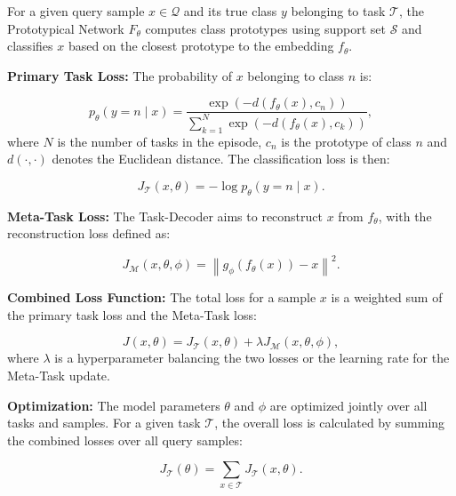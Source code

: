For a given query sample \( x\in\mathcal{Q} \) and its true class \( y \) belonging to task $\mathcal{T}$, the Prototypical Network $F_{\theta}$ computes class prototypes using support set $\mathcal{S}$ and classifies $x$ based on the closest prototype to the embedding $f_{\theta}$.

\noindent
\textbf{Primary Task Loss:} The probability of \( x \) belonging to class \( n \) is:

\begin{equation} p_{\theta}(y={n} \mid x) = \frac{\exp\left(-d\left(f_{\theta}(x), c_{{n}}\right)\right)}{\sum_{k=1}^{N} \exp\left(-d\left(f_{\theta}(x), c_k\right)\right)}, \end{equation}
where $N$ is the number of tasks in the episode, \( c_n \) is the prototype of class \( n \) and \( d(\cdot, \cdot) \) denotes the Euclidean distance. The classification loss is then:

\begin{equation}
J_{\mathcal{T}}(x, \theta) = -\log p_{\theta}(y = n \mid x).
\end{equation}

\noindent
\textbf{Meta-Task Loss:} The Task-Decoder aims to reconstruct \( x \) from \( f_{\theta} \), with the reconstruction loss defined as:

\begin{equation}
J_{\mathcal{M}}(x, \theta, \phi) = \left\| g_{\phi}(f_{\theta}(x)) - x \right\|^2.
\end{equation}

\noindent
\textbf{Combined Loss Function:} The total loss for a sample \( x \) is a weighted sum of the primary task loss and the Meta-Task loss:

\begin{equation}
J(x, \theta) = J_{\mathcal{T}}(x, \theta) + \lambda J_{\mathcal{M}}(x, \theta, \phi),
\end{equation}
where \( \lambda \) is a hyperparameter balancing the two losses or the learning rate for the Meta-Task update.

\noindent
\textbf{Optimization:} The model parameters \( \theta \) and \( \phi \) are optimized jointly over all tasks and samples. For a given task $\mathcal{T}$, the overall loss is calculated by summing the combined losses over all query samples:

\begin{equation}\label{eq:task_loss}
J_{\mathcal{T}}(\theta) = \sum_{x \in \mathcal{T}} J_{\mathcal{T}}(x, \theta). 
\end{equation}

